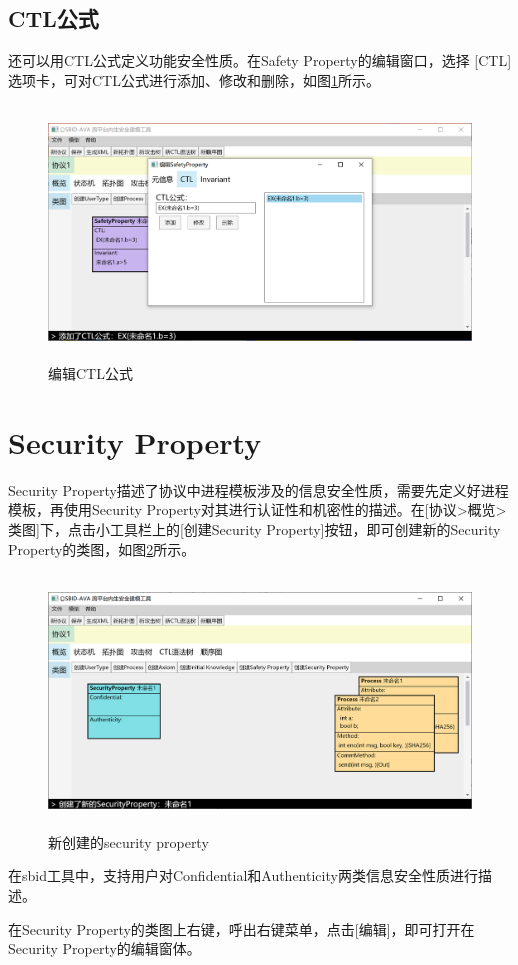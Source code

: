 \subsection{CTL公式}
\par
还可以用CTL公式定义功能安全性质。在Safety Property的编辑窗口，选择 [CTL]选项卡，可对CTL公式进行添加、修改和删除，如图\ref{safety_edit_ctl}所示。
\begin{figure}[h]
	\centering
	\includegraphics[width=12cm,height=6.75cm]{imgs/safety_edit_ctl.png}
	\caption{编辑CTL公式}
	\label{safety_edit_ctl}
\end{figure}

\section{Security Property}
Security Property描述了协议中进程模板涉及的信息安全性质，需要先定义好进程模板，再使用Security Property对其进行认证性和机密性的描述。在[协议>概览>类图]下，点击小工具栏上的[创建Security Property]按钮，即可创建新的Security Property的类图，如图\ref{create_security}所示。
\begin{figure}[h]
	\centering
	\includegraphics[width=12cm,height=6.75cm]{imgs/create_security.png}
	\caption{新创建的security property}
	\label{create_security}
\end{figure}
\par
在sbid工具中，支持用户对Confidential和Authenticity两类信息安全性质进行描述。
\par
在Security Property的类图上右键，呼出右键菜单，点击[编辑]，即可打开在Security Property的编辑窗体。
